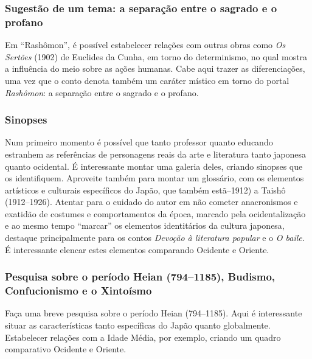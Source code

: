 \documentclass[12pt]{extarticle}
\begin{document}

\subsubsection{Sugestão de um tema: a separação entre o sagrado e o profano}

Em ``Rashômon'', é possível estabelecer relações com outras obras como \textit{Os Sertões}
(1902) de Euclides da Cunha, em torno do determinismo, no qual mostra a
influência do meio sobre as ações humanas. Cabe aqui trazer as diferenciações,
uma vez que o conto denota também um caráter místico em torno do portal
\emph{Rashômon}: a separação entre o sagrado e o profano.

\subsubsection{Sinopses}

Num primeiro momento é possível que tanto professor quanto educando estranhem
as referências de personagens reais da arte e literatura tanto japonesa quanto
ocidental. É interessante montar uma galeria deles, criando sinopses que os
identifiquem. Aproveite também para montar um glossário, com os elementos
artísticos e culturais específicos do Japão, que também estã--1912) a Taishô
(1912--1926). Atentar para o cuidado do autor em não cometer anacronismos e
exatidão de costumes e comportamentos da época, marcado pela ocidentalização e
ao mesmo tempo ``marcar'' os elementos identitários da cultura japonesa,
destaque principalmente para os contos \textit{Devoção à literatura popular} e o \textit{O
baile}. É interessante elencar estes elementos comparando Ocidente e Oriente.

\subsubsection{Pesquisa sobre o período Heian (794--1185), Budismo, Confucionismo e o
Xintoísmo}

Faça uma breve pesquisa sobre o período Heian (794--1185). Aqui é interessante
situar as características tanto específicas do Japão quanto globalmente.
Estabelecer relações com a Idade Média, por exemplo, criando um quadro
comparativo Ocidente e Oriente.
\end{document}
